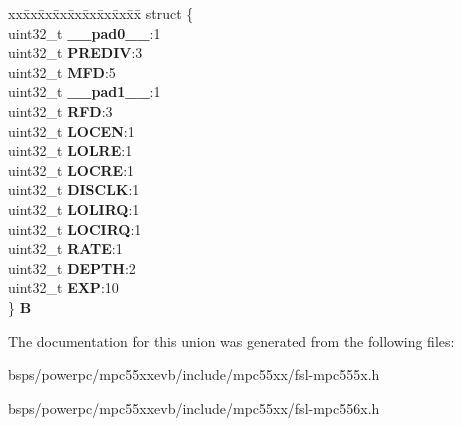 \begin{DoxyCompactItemize}
\begin{tabbing}
\end{tabbing}\item 
\mbox{\label{unionFMPLL__tag_1_1FMPLL__SYNCR__tag_a5ccf967e8bb1ddede438ced81996a7d4}} 
\begin{tabbing}
xx\=xx\=xx\=xx\=xx\=xx\=xx\=xx\=xx\=\kill
struct \{\\
\>uint32\_t {\bfseries \_\_pad0\_\_}:1\\
\>uint32\_t {\bfseries PREDIV}:3\\
\>uint32\_t {\bfseries MFD}:5\\
\>uint32\_t {\bfseries \_\_pad1\_\_}:1\\
\>uint32\_t {\bfseries RFD}:3\\
\>uint32\_t {\bfseries LOCEN}:1\\
\>uint32\_t {\bfseries LOLRE}:1\\
\>uint32\_t {\bfseries LOCRE}:1\\
\>uint32\_t {\bfseries DISCLK}:1\\
\>uint32\_t {\bfseries LOLIRQ}:1\\
\>uint32\_t {\bfseries LOCIRQ}:1\\
\>uint32\_t {\bfseries RATE}:1\\
\>uint32\_t {\bfseries DEPTH}:2\\
\>uint32\_t {\bfseries EXP}:10\\
\} {\bfseries B}\\

\end{tabbing}\end{DoxyCompactItemize}


The documentation for this union was generated from the following files\+:\begin{DoxyCompactItemize}
\item 
bsps/powerpc/mpc55xxevb/include/mpc55xx/fsl-\/mpc555x.\+h\item 
bsps/powerpc/mpc55xxevb/include/mpc55xx/fsl-\/mpc556x.\+h\end{DoxyCompactItemize}
